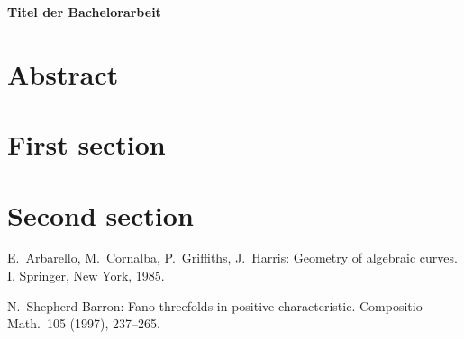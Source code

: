 \documentclass[12pt,titlepage,a4paper,onesided]{article}
\begin{document}
\begin{titlepage}
\begin{center}

\textbf{\LARGE Titel der Bachelorarbeit}

\end{center}
\end{titlepage}
\tableofcontents
\pagebreak
\section*{Abstract}
\pagebreak
\section{First section}
\section{Second section}
\pagebreak
\begin{thebibliography}{ccccc}

E.\ Arbarello, M.\ Cornalba, P.\ Griffiths, J.\ Harris:
Geometry of algebraic curves. I.
Springer, New York, 1985.

N.\ Shepherd-Barron:
Fano threefolds in positive characteristic.
Compositio Math.\  105  (1997),  237--265.
\end{thebibliography}
\end{document}
